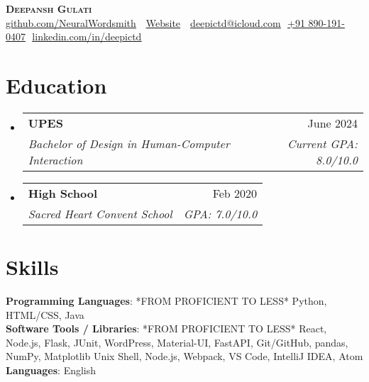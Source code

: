 \documentclass[letterpaper,11pt]{article}
\makeatletter
\newcommand{\resumeSubheading}[4]{
  \vspace{-2pt}\item
    \begin{tabular*}{0.97\textwidth}[t]{l@{\extracolsep{\fill}}r}
      \textbf{#1} & #2 \\
      \textit{\small#3} & \textit{\small #4} \\
    \end{tabular*}\vspace{-7pt}
}
\newcommand{\resumeSubHeadingListStart}{\begin{itemize}[leftmargin=0.15in, label={}]}
\newcommand{\resumeSubHeadingListEnd}{\end{itemize}}
\makeatother
\begin{document}
\begin{flushright}
  \vspace{-4pt}
\end{flushright}

\vspace{-7pt}

\begin{center}
    \textbf{\Huge \scshape Deepansh Gulati} \\ \vspace{8pt}
    \small 
    \faGithub
    \href{https://github.com/NeuralWordsmith}{\underline{github.com/NeuralWordsmith}} $  $
    \faCode $  $
    \href{https://neuralwordsmith.github.io/}
    {\underline{Website}} $  $
    \faEnvelope$  $
    \href{mailto:deepictd@icloud.com}
    {\underline{deepictd@icloud.com}}
    \faPhone$  $
    \underline{+91 890-191-0407}
    \faLinkedin$  $
    \href{https://linkedin.com/in/deepictd}{\underline{linkedin.com/in/deepictd}} $  $
\end{center}

\section{Education}
  \resumeSubHeadingListStart
  
    \resumeSubheading
      {UPES}{June 2024}
      {Bachelor of Design in Human-Computer Interaction}{Current GPA: 8.0/10.0}
      
    \resumeSubheading
      {High School \footnotesize}{Feb 2020}
      {Sacred Heart Convent School}{GPA: 7.0/10.0}

  \resumeSubHeadingListEnd

\section{Skills}
 \begin{itemize}[leftmargin=0.15in, label={}]
    \small{\item{
    
     \textbf{Programming Languages}{: *FROM PROFICIENT TO LESS* Python, HTML/CSS, Java} \\
     
     \textbf{Software Tools / Libraries}{: *FROM PROFICIENT TO LESS* React, Node.js, Flask, JUnit, WordPress, Material-UI, FastAPI, Git/GitHub, pandas, NumPy, Matplotlib Unix Shell, Node.js, Webpack, VS Code, IntelliJ IDEA, Atom} \\

     \textbf{Languages}{: English} \\
     
    }}
 \end{itemize}
\end{document}
